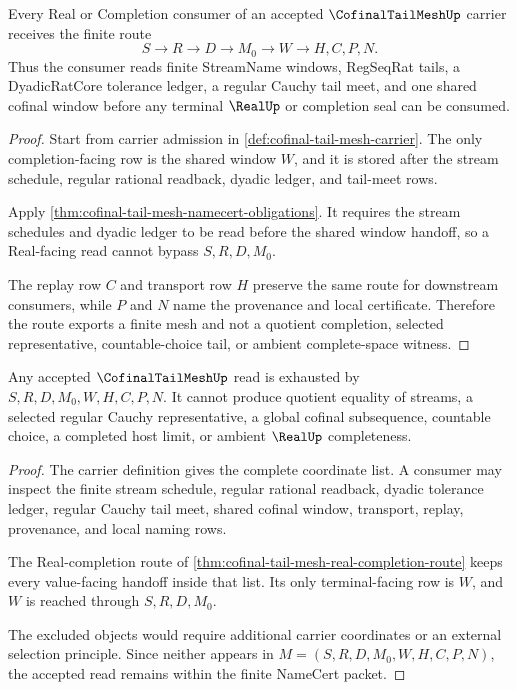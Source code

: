\begin{theorem}
\label{thm:cofinal-tail-mesh-real-completion-route}
Every Real or Completion consumer of an accepted $\CofinalTailMeshUp$ carrier receives the finite route
$$
S \longrightarrow R \longrightarrow D \longrightarrow M_0 \longrightarrow W \longrightarrow H,C,P,N .
$$
Thus the consumer reads finite StreamName windows, RegSeqRat tails, a DyadicRatCore tolerance ledger, a regular Cauchy tail meet, and one shared cofinal window before any terminal $\RealUp$ or completion seal can be consumed.
\end{theorem}
\begin{proof}
Start from carrier admission in \autoref{def:cofinal-tail-mesh-carrier}. The only completion-facing row is the shared window $W$, and it is stored after the stream schedule, regular rational readback, dyadic ledger, and tail-meet rows.

Apply \autoref{thm:cofinal-tail-mesh-namecert-obligations}. It requires the stream schedules and dyadic ledger to be read before the shared window handoff, so a Real-facing read cannot bypass $S,R,D,M_0$.

The replay row $C$ and transport row $H$ preserve the same route for downstream consumers, while $P$ and $N$ name the provenance and local certificate. Therefore the route exports a finite mesh and not a quotient completion, selected representative, countable-choice tail, or ambient complete-space witness.
\end{proof}

\begin{theorem}
\label{thm:cofinal-tail-mesh-nonescape}
Any accepted $\CofinalTailMeshUp$ read is exhausted by $S,R,D,M_0,W,H,C,P,N$. It cannot produce quotient equality of streams, a selected regular Cauchy representative, a global cofinal subsequence, countable choice, a completed host limit, or ambient $\RealUp$ completeness.
\end{theorem}
\begin{proof}
The carrier definition gives the complete coordinate list. A consumer may inspect the finite stream schedule, regular rational readback, dyadic tolerance ledger, regular Cauchy tail meet, shared cofinal window, transport, replay, provenance, and local naming rows.

The Real-completion route of \autoref{thm:cofinal-tail-mesh-real-completion-route} keeps every value-facing handoff inside that list. Its only terminal-facing row is $W$, and $W$ is reached through $S,R,D,M_0$.

The excluded objects would require additional carrier coordinates or an external selection principle. Since neither appears in $M=(S,R,D,M_0,W,H,C,P,N)$, the accepted read remains within the finite NameCert packet.
\end{proof}

